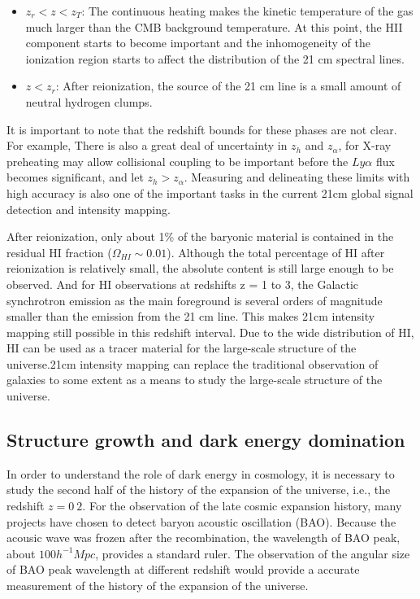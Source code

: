 \documentclass{article}
\begin{document}
\begin{itemize}
    \item $z_r<z<z_T$: The continuous heating makes the kinetic temperature of the gas much larger than the CMB background temperature. At this point, the HII component starts to become important and the inhomogeneity of the ionization region starts to affect the distribution of the 21 cm spectral lines.
    \item $z<z_r$: After reionization, the source of the 21 cm line is a small amount of neutral hydrogen clumps.
\end{itemize}
It is important to note that the redshift bounds for these phases are not clear. For example, There is also a great deal of uncertainty in $z_h$ and $z_\alpha$, for X-ray preheating may allow collisional coupling to be important before the $Ly\alpha$ flux becomes significant, and let $z_h>z_\alpha$. Measuring and delineating these limits with high accuracy is also one of the important tasks in the current 21cm global signal detection and intensity mapping.

After reionization, only about 1\% of the baryonic material is contained in the residual HI fraction ($\Omega_{HI}\sim 0.01$). Although the total percentage of HI after reionization is relatively small, the absolute content is still large enough to be observed. And for HI observations at redshifts z = 1 to 3, the Galactic synchrotron emission as the main foreground is several orders of magnitude smaller than the emission from the 21 cm line. This makes 21cm intensity mapping still possible in this redshift interval. Due to the wide distribution of HI, HI can be used as a tracer material for the large-scale structure of the universe.21cm intensity mapping can replace the traditional observation of galaxies to some extent as a means to study the large-scale structure of the universe.

\subsection{Structure growth and dark energy domination}
In order to understand the role of dark energy in cosmology, it is necessary to study the second half of the history of the expansion of the universe, i.e., the redshift $z=0~2$. For the observation of the late cosmic expansion history, many projects have chosen to detect baryon acoustic oscillation (BAO). Because the acousic wave was frozen after the recombination, the wavelength of BAO peak, about $100h^{-1}Mpc$, provides a standard ruler. The observation of the angular size of BAO peak wavelength at different redshift would provide a accurate measurement of the history of the expansion of the universe.
\end{document}
